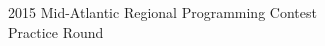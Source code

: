 \documentclass[12pt,letterpaper]{article}
\begin{document}
{\sffamily
\bfseries
\Large 
\begin{center}
\protect\rule{0pt}{1.1em}2015 Mid-Atlantic Regional Programming Contest\\
Practice Round
\end{center}
}


\newif\ifPRACTICE
\PRACTICEtrue



\clearpage



\end{document}
